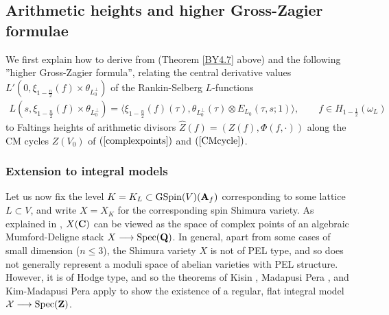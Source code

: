 \documentclass{amsart}
\theoremstyle{definition}
\theoremstyle{definition}
\theoremstyle{definition}
\begin{document}
\subsection{Arithmetic heights and higher Gross-Zagier formulae}

We first explain how to derive from \cite[Theorem 4.7]{BY} (Theorem \ref{BY4.7} above) and \cite[Theorem A]{AGHMP} the following 
''higher Gross-Zagier formula'', relating the central derivative values $L'(0, \xi_{1-\frac{n}{2}}(f) \times \theta_{L_0^{\perp}})$ of the Rankin-Selberg $L$-functions 
\begin{align*} L(s, \xi_{1-\frac{n}{2}}(f) \times \theta_{L_0^{\perp}}) = \langle \xi_{1- \frac{n}{2}}(f)(\tau), \theta_{L_0^{\perp}}(\tau) \otimes E_{L_0}(\tau, s; 1) \rangle,
\quad \quad f \in H_{1- \frac{1}{2}}(\omega_L) \end{align*}
to Faltings heights of arithmetic divisors $\widehat{Z}(f) = (Z(f), \Phi(f, \cdot))$ along the CM cycles $Z(V_0)$ of $(\ref{complexpoints})$ and $(\ref{CMcycle})$.

\subsubsection{Extension to integral models}

Let us now fix the level $K = K_L \subset \operatorname{GSpin}(V)({\bf{A}}_f)$ corresponding to some lattice $L \subset V$, and write $X = X_K$ for the corresponding spin Shimura variety. 
As explained in \cite{AGHMP}, $X({\bf{C}})$ can be viewed as the space of complex points of an algebraic
Mumford-Deligne stack $X \longrightarrow \operatorname{Spec}({\bf{Q}})$. In general, apart from some cases of small dimension ($n \leq 3$), 
the Shimura variety $X$ is not of PEL type, and so does not generally represent a moduli space of abelian varieties with PEL structure.
However, it is of Hodge type, and so the theorems of Kisin \cite{Ki}, Madapusi Pera \cite{MP}, and Kim-Madapusi Pera \cite{KMP} apply to 
show the existence of a regular, flat integral model $\mathcal{X} \longrightarrow \operatorname{Spec}({\bf{Z}})$.
\end{document}
